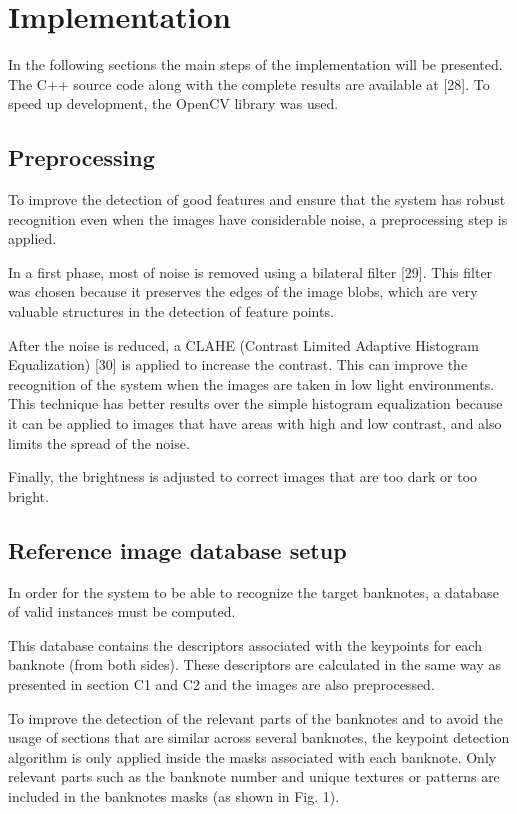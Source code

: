 \section{Implementation}\label{sec:implementation}

In the following sections the main steps of the implementation will be presented. The C++ source code along with the complete results are available at [28]. To speed up development, the OpenCV library was used.


\subsection{Preprocessing}

To improve the detection of good features and ensure that the system has robust recognition even when the images have considerable noise, a preprocessing step is applied.

In a first phase, most of noise is removed using a bilateral filter [29]. This filter was chosen because it preserves the edges of the image blobs, which are very valuable structures in the detection of feature points.

After the noise is reduced, a CLAHE (Contrast Limited Adaptive Histogram Equalization) [30] is applied to increase the contrast. This can improve the recognition of the system when the images are taken in low light environments. This technique has better results over the simple histogram equalization because it can be applied to images that have areas with high and low contrast, and also limits the spread of the noise.

Finally, the brightness is adjusted to correct images that are too dark or too bright.


\subsection{Reference image database setup}

In order for the system to be able to recognize the target banknotes, a database of valid instances must be computed.

This database contains the descriptors associated with the keypoints for each banknote (from both sides). These descriptors are calculated in the same way as presented in section C1 and C2 and the images are also preprocessed.

To improve the detection of the relevant parts of the banknotes and to avoid the usage of sections that are similar across several banknotes, the keypoint detection algorithm is only applied inside the masks associated with each banknote. Only relevant parts such as the banknote number and unique textures or patterns are included in the banknotes masks (as shown in Fig. 1).

